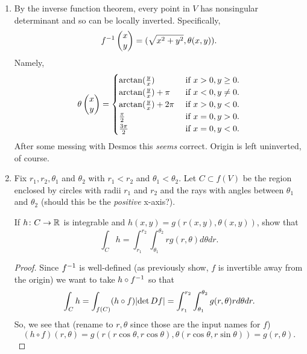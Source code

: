 \documentclass{article}
\begin{document}
\begin{enumerate}[start=1,label={(\alph*)}]
  \item By the inverse function theorem, every point in $V$ has nonsingular determinant and so can be locally inverted.
        Specifically,
        \[ f^{-1} \begin{pmatrix} x \\ y \end{pmatrix} = (\sqrt{x^{2} + y^{2}}, \theta(x, y)). \]
        Namely,
        \[
        \theta \begin{pmatrix} x \\ y \end{pmatrix} = \begin{cases}
          \arctan\lparen\frac{y}{x}\rparen & \text{ if } x > 0, y \ge 0.\\
          \arctan\lparen\frac{y}{x}\rparen + \pi & \text{ if } x < 0, y \ne 0. \\
          \arctan\lparen\frac{y}{x}\rparen + 2\pi & \text{ if } x > 0, y < 0. \\
          \frac{\pi}{2} & \text{ if } x = 0, y > 0.\\
          \frac{3\pi}{2} & \text{ if } x = 0, y < 0.
        \end{cases}
        \]
        After some messing with Desmos this \emph{seems} correct. Origin is left uninverted, of course.

  \item Fix $r_{1}, r_{2}, \theta_{1}$ and $\theta_{2}$ with $r_{1} < r_{2}$ and $\theta_{1} < \theta_{2}$.
        Let $C \subset f(V)$ be the region enclosed by circles with radii $r_{1}$ and $r_{2}$ and the rays with angles between $\theta_{1}$ and $\theta_{2}$ (should this be the \emph{positive} x-axis?).

        If $h \colon C \to \mathbb{R}^{}$ is integrable and $h(x, y) = g(r(x, y), \theta(x, y))$, show that
        \[ \int_{C}h = \int_{r_{1}}^{r_{2}}\int_{\theta_{1}}^{\theta_{2}}r g(r, \theta) d\theta dr. \]

        \begin{proof}
          Since $f^{-1}$ is well-defined (as previously show, $f$ is invertible away from the origin) we want to take $h \circ f^{-1}$ so that
          \[ \int_{C}h = \int_{f(C)}(h \circ f) \lvert\det Df\rvert = \int_{r_{1}}^{r_{2}}\int_{\theta_{1}}^{\theta_{2}} g(r, \theta) r d\theta dr. \]
          So, we see that (rename to $r, \theta$ since those are the input names for $f$)
          \[ (h \circ f)(r, \theta) = g(r(r \cos \theta, r \cos \theta), \theta(r \cos \theta, r \sin \theta)) = g(r, \theta). \]
        \end{proof}


\end{enumerate}
\end{document}

